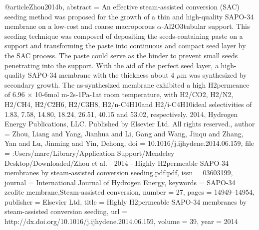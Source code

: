 @article{Zhou2014b,
abstract = {An effective steam-assisted conversion (SAC) seeding method was proposed for the growth of a thin and high-quality SAPO-34 membrane on a low-cost and coarse macroporous $\alpha$-Al2O3tubular support. This seeding technique was composed of depositing the seeds-containing paste on a support and transforming the paste into continuous and compact seed layer by the SAC process. The paste could serve as the binder to prevent small seeds penetrating into the support. With the aid of the perfect seed layer, a high-quality SAPO-34 membrane with the thickness about 4 $\mu$m was synthesized by secondary growth. The as-synthesized membrane exhibited a high H2permeance of 6.96 × 10-6mol m-2s-1Pa-1at room temperature, with H2/CO2, H2/N2, H2/CH4, H2/C2H6, H2/C3H8, H2/n-C4H10and H2/i-C4H10ideal selectivities of 1.83, 7.58, 14.80, 18.24, 26.51, 40.15 and 53.02, respectively. {\textcopyright} 2014, Hydrogen Energy Publications, LLC. Published by Elsevier Ltd. All rights reserved.},
author = {Zhou, Liang and Yang, Jianhua and Li, Gang and Wang, Jinqu and Zhang, Yan and Lu, Jinming and Yin, Dehong},
doi = {10.1016/j.ijhydene.2014.06.159},
file = {:Users/marc/Library/Application Support/Mendeley Desktop/Downloaded/Zhou et al. - 2014 - Highly H2permeable SAPO-34 membranes by steam-assisted conversion seeding.pdf:pdf},
issn = {03603199},
journal = {International Journal of Hydrogen Energy},
keywords = {SAPO-34 zeolite membrane,Steam-assisted conversion},
number = {27},
pages = {14949--14954},
publisher = {Elsevier Ltd},
title = {{Highly H2permeable SAPO-34 membranes by steam-assisted conversion seeding}},
url = {http://dx.doi.org/10.1016/j.ijhydene.2014.06.159},
volume = {39},
year = {2014}
}
